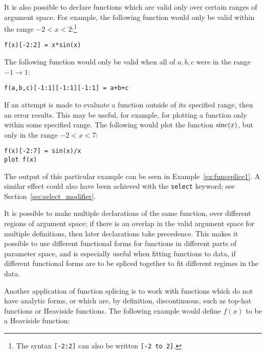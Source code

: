 \noindent It is also possible to declare functions which are valid only over
certain ranges of argument space. For example, the following function would
only be valid within the range $-2<x<2$:\footnote{The syntax {\tt [-2:2]} can
also be written {\tt [-2 to 2]}.}

\begin{verbatim}
f(x)[-2:2] = x*sin(x)
\end{verbatim}

\noindent The following function would only be valid when all of ${a,b,c}$ were
in the range $-1 \to 1$:

\begin{verbatim}
f(a,b,c)[-1:1][-1:1][-1:1] = a+b+c
\end{verbatim}

If an attempt is made to evaluate a function outside of its specified range,
then an error results. This may be useful, for example, for plotting a function
only within some specified range. The following would plot the function
${\rm sinc}(x)$, but only in the range $-2<x<7$:

\begin{verbatim}
f(x)[-2:7] = sin(x)/x
plot f(x)
\end{verbatim}


\noindent The output of this particular example can be seen in
Example~\ref{ex:funcsplice1}. A similar effect could also have been achieved
with the {\tt select} keyword; see Section~\ref{sec:select_modifier}.

It is possible to make multiple declarations of the same function, over
different regions of argument space; if there is an overlap in the valid
argument space for multiple definitions, then later declarations take
precedence. This makes it possible to use different functional forms for
functions in different parts of parameter space, and is especially useful when
fitting functions to data, if different functional forms are to be spliced
together to fit different regimes in the data.

Another application of function splicing is to work with functions which do not
have analytic forms, or which are, by definition, discontinuous, such as
top-hat functions or Heaviside functions. The following example would define
$f(x)$ to be a Heaviside function:

